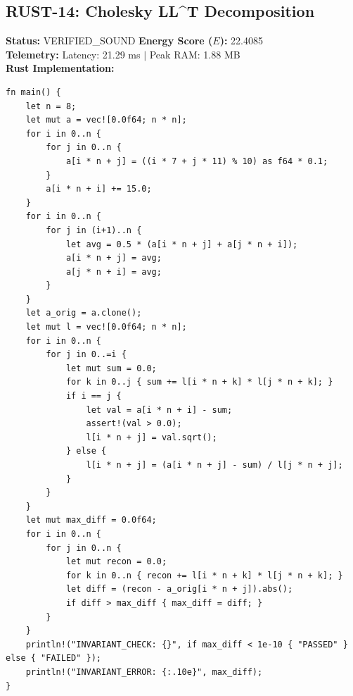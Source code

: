 \documentclass[11pt, a4paper]{article}
\begin{document}
\subsection{RUST-14: Cholesky LL\textasciicircum{}T Decomposition}
\textbf{Status:} VERIFIED\_SOUND \hfill \textbf{Energy Score ($E$):} 22.4085\\
\textbf{Telemetry:} Latency: 21.29 ms $|$ Peak RAM: 1.88 MB\\
\textbf{Rust Implementation:}
\begin{verbatim}
fn main() {
    let n = 8;
    let mut a = vec![0.0f64; n * n];
    for i in 0..n {
        for j in 0..n {
            a[i * n + j] = ((i * 7 + j * 11) % 10) as f64 * 0.1;
        }
        a[i * n + i] += 15.0;
    }
    for i in 0..n {
        for j in (i+1)..n {
            let avg = 0.5 * (a[i * n + j] + a[j * n + i]);
            a[i * n + j] = avg;
            a[j * n + i] = avg;
        }
    }
    let a_orig = a.clone();
    let mut l = vec![0.0f64; n * n];
    for i in 0..n {
        for j in 0..=i {
            let mut sum = 0.0;
            for k in 0..j { sum += l[i * n + k] * l[j * n + k]; }
            if i == j {
                let val = a[i * n + i] - sum;
                assert!(val > 0.0);
                l[i * n + j] = val.sqrt();
            } else {
                l[i * n + j] = (a[i * n + j] - sum) / l[j * n + j];
            }
        }
    }
    let mut max_diff = 0.0f64;
    for i in 0..n {
        for j in 0..n {
            let mut recon = 0.0;
            for k in 0..n { recon += l[i * n + k] * l[j * n + k]; }
            let diff = (recon - a_orig[i * n + j]).abs();
            if diff > max_diff { max_diff = diff; }
        }
    }
    println!("INVARIANT_CHECK: {}", if max_diff < 1e-10 { "PASSED" } else { "FAILED" });
    println!("INVARIANT_ERROR: {:.10e}", max_diff);
}
\end{verbatim}
\end{document}
